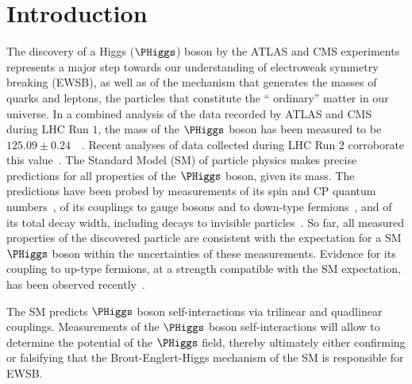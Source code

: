 \section{Introduction}
\label{sec:introduction}

The discovery of a Higgs ($\PHiggs$) boson by the ATLAS and CMS experiments~\cite{Higgs-Discovery_ATLAS,Higgs-Discovery_CMS}
represents a major step towards our understanding of electroweak symmetry breaking (EWSB),
as well as of the mechanism that generates the masses of quarks and leptons, 
the particles that constitute the `` ordinary'' matter in our universe.
In a combined analysis of the data recorded by ATLAS and CMS during LHC Run $1$, 
the mass of the $\PHiggs$ boson has been measured to be $125.09 \pm 0.24$~\GeV~\cite{HIG-14-042}.
Recent analyses of data collected during LHC Run $2$ corroborate this value~\cite{HIG-16-041,Aaboud:2018wps}.
The Standard Model (SM) of particle physics makes precise predictions for all properties of the $\PHiggs$ boson, given its mass. 
The predictions have been probed by measurements of its spin and CP quantum numbers~\cite{HIG-14-018,Aad:2015mxa,Aad:2016nal},
of its couplings to gauge bosons and to down-type fermions~\cite{HIG-15-002},
and of its total decay width, including decays to invisible particles~\cite{HIG-13-030,HIG-14-032,Aad:2015pla}.
So far, all measured properties of the discovered particle are consistent with the expectation for a SM $\PHiggs$ boson 
within the uncertainties of these measurements.
Evidence for its coupling to up-type fermions, at a strength compatible with the SM expectation, has been observed recently~\cite{Aaboud:2018urx,HIG-17-035}.

The SM predicts $\PHiggs$ boson self-interactions via trilinear and quadlinear couplings. 
Measurements of the $\PHiggs$ boson self-interactions will allow to determine the potential of the $\PHiggs$ field,
thereby ultimately either confirming or falsifying that the Brout-Englert-Higgs mechanism of the SM is responsible for EWSB.


